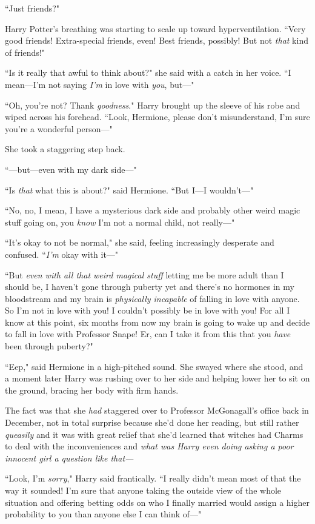 ``Just friends?"

Harry Potter's breathing was starting to scale up toward hyperventilation. ``Very good friends! Extra-special friends, even! Best friends, possibly! But not \emph{that} kind of friends!"

``Is it really that awful to think about?" she said with a catch in her voice. ``I mean—I'm not saying \emph{I'm} in love with \emph{you}, but—"

``Oh, you're not? Thank \emph{goodness}." Harry brought up the sleeve of his robe and wiped across his forehead. ``Look, Hermione, please don't misunderstand, I'm sure you're a wonderful person—"

She took a staggering step back.

``—but—even with my dark side—"

``Is \emph{that} what this is about?" said Hermione. ``But I—I wouldn't—"

``No, no, I mean, I have a mysterious dark side and probably other weird magic stuff going on, you \emph{know} I'm not a normal child, not really—"

``It's okay to not be normal," she said, feeling increasingly desperate and confused. ``\emph{I'm} okay with it—"

``But \emph{even with all that weird magical stuff} letting me be more adult than I should be, I haven't gone through puberty yet and there's no hormones in my bloodstream and my brain is \emph{physically incapable} of falling in love with anyone. So I'm not in love with you! I couldn't possibly be in love with you! For all I know at this point, six months from now my brain is going to wake up and decide to fall in love with Professor Snape! Er, can I take it from this that you \emph{have} been through puberty?"

``Eep," said Hermione in a high-pitched sound. She swayed where she stood, and a moment later Harry was rushing over to her side and helping lower her to sit on the ground, bracing her body with firm hands.

The fact was that she \emph{had} staggered over to Professor McGonagall's office back in December, not in total surprise because she'd done her reading, but still rather \emph{queasily} and it was with great relief that she'd learned that witches had Charms to deal with the inconveniences and \emph{what was Harry even doing asking a poor innocent girl a question like that—}

``Look, I'm \emph{sorry}," Harry said frantically. ``I really didn't mean most of that the way it sounded! I'm sure that anyone taking the outside view of the whole situation and offering betting odds on who I finally married would assign a higher probability to you than anyone else I can think of—"

